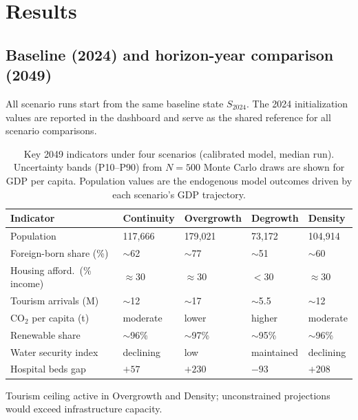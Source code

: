 \documentclass{article}
\begin{document}
\section{Results}
\label{sec:results}

\subsection{Baseline (2024) and horizon-year comparison (2049)}
\label{subsec:baseline_and_2049}

All scenario runs start from the same baseline state $S_{2024}$. The 2024
initialization values are reported in the dashboard and serve as the shared
reference for all scenario comparisons.

\begin{table}[htbp]
\centering
\caption{Key 2049 indicators under four scenarios (calibrated model, median
         run). Uncertainty bands (P10--P90) from $N=500$ Monte Carlo draws are
         shown for GDP per capita. Population values are the endogenous model
         outcomes driven by each scenario's GDP trajectory.}
\label{tab:scenarios_2049}
\small
\begin{threeparttable}
\begin{tabularx}{\textwidth}{lXXXX}
\toprule
\textbf{Indicator} & \textbf{Continuity} & \textbf{Overgrowth}
                   & \textbf{Degrowth}   & \textbf{Density} \\
\midrule
Population
  & 117{,}666 & 179{,}021 & 73{,}172 & 104{,}914 \\
Foreign-born share (\%)
  & $\sim$62 & $\sim$77 & $\sim$51 & $\sim$60 \\
Housing afford.\ (\% income)
  & $\approx$30 & $\approx$30 & $<$30 & $\approx$30 \\
Tourism arrivals (M)\tnote{$\dagger$}
  & $\sim$12 & $\sim$17 & $\sim$5.5 & $\sim$12 \\
CO$_2$ per capita (t)
  & moderate & lower & higher & moderate \\
Renewable share
  & $\sim$96\% & $\sim$97\% & $\sim$95\% & $\sim$96\% \\
Water security index
  & declining & low & maintained & declining \\
Hospital beds gap
  & $+57$ & $+230$ & $-93$ & $+208$ \\
\bottomrule
\end{tabularx}
\begin{tablenotes}
  \item[$\dagger$] Tourism ceiling active in Overgrowth and Density;
        unconstrained projections would exceed infrastructure capacity.
\end{tablenotes}
\end{threeparttable}
\end{table}
\end{document}

